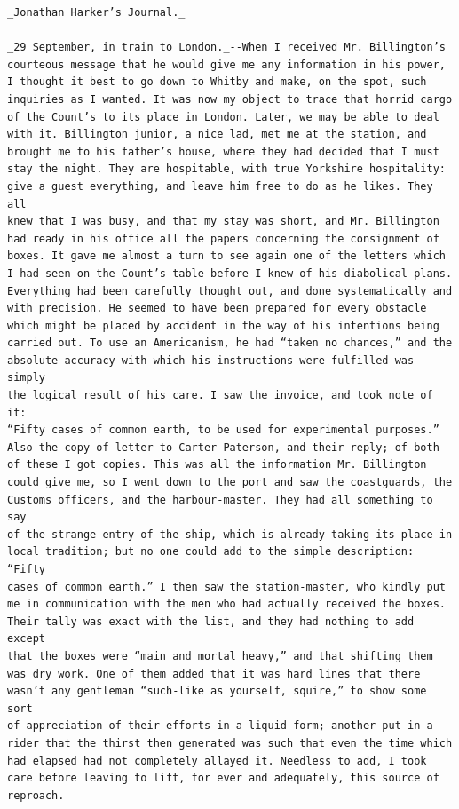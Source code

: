 \documentclass{article}
\begin{document}
\begin{verbatim}
_Jonathan Harker’s Journal._

_29 September, in train to London._--When I received Mr. Billington’s
courteous message that he would give me any information in his power,
I thought it best to go down to Whitby and make, on the spot, such
inquiries as I wanted. It was now my object to trace that horrid cargo
of the Count’s to its place in London. Later, we may be able to deal
with it. Billington junior, a nice lad, met me at the station, and
brought me to his father’s house, where they had decided that I must
stay the night. They are hospitable, with true Yorkshire hospitality:
give a guest everything, and leave him free to do as he likes. They all
knew that I was busy, and that my stay was short, and Mr. Billington
had ready in his office all the papers concerning the consignment of
boxes. It gave me almost a turn to see again one of the letters which
I had seen on the Count’s table before I knew of his diabolical plans.
Everything had been carefully thought out, and done systematically and
with precision. He seemed to have been prepared for every obstacle
which might be placed by accident in the way of his intentions being
carried out. To use an Americanism, he had “taken no chances,” and the
absolute accuracy with which his instructions were fulfilled was simply
the logical result of his care. I saw the invoice, and took note of it:
“Fifty cases of common earth, to be used for experimental purposes.”
Also the copy of letter to Carter Paterson, and their reply; of both
of these I got copies. This was all the information Mr. Billington
could give me, so I went down to the port and saw the coastguards, the
Customs officers, and the harbour-master. They had all something to say
of the strange entry of the ship, which is already taking its place in
local tradition; but no one could add to the simple description: “Fifty
cases of common earth.” I then saw the station-master, who kindly put
me in communication with the men who had actually received the boxes.
Their tally was exact with the list, and they had nothing to add except
that the boxes were “main and mortal heavy,” and that shifting them
was dry work. One of them added that it was hard lines that there
wasn’t any gentleman “such-like as yourself, squire,” to show some sort
of appreciation of their efforts in a liquid form; another put in a
rider that the thirst then generated was such that even the time which
had elapsed had not completely allayed it. Needless to add, I took
care before leaving to lift, for ever and adequately, this source of
reproach.


\end{verbatim}
\end{document}

